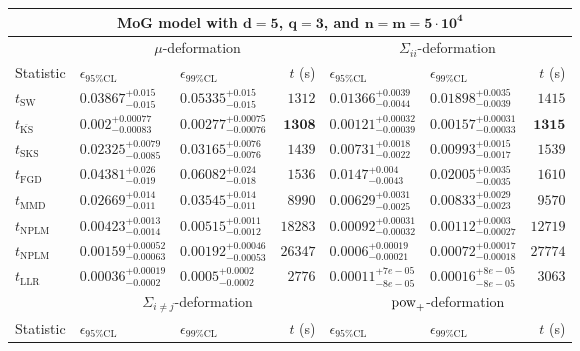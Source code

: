 \begin{tabular}{l|llr|llr}
	\toprule
	\multicolumn{7}{c}{{\bf MoG model with $\mathbf{d=5}$, $\mathbf{q=3}$, and $\mathbf{n=m=5\cdot 10^{4}}$}} \\
	\toprule
	\multicolumn{1}{c}{} & \multicolumn{3}{c}{$\mu$-deformation} & \multicolumn{3}{c}{$\Sigma_{ii}$-deformation} \\
	Statistic & $\epsilon_{95\%\mathrm{CL}}$ & $\epsilon_{99\%\mathrm{CL}}$ & $t$ (s) & $\epsilon_{95\%\mathrm{CL}}$ & $\epsilon_{99\%\mathrm{CL}}$ & $t$ (s) \\
	\midrule
	$t_{\mathrm{SW}}$ & $0.03867_{-0.015}^{+0.015}$ & $0.05335_{-0.015}^{+0.015}$ & $1312$ & $0.01366_{-0.0044}^{+0.0039}$ & $0.01898_{-0.0039}^{+0.0035}$ & $1415$ \\
	$t_{\overline{\mathrm{KS}}}$ & ${\mathbf{0.002_{-0.00083}^{+0.00077}}}$ & ${\mathbf{0.00277_{-0.00076}^{+0.00075}}}$ & ${\mathbf{1308}}$ & ${\mathbf{0.00121_{-0.00039}^{+0.00032}}}$ & ${\mathbf{0.00157_{-0.00033}^{+0.00031}}}$ & ${\mathbf{1315}}$ \\
	$t_{\mathrm{SKS}}$ & $0.02325_{-0.0085}^{+0.0079}$ & $0.03165_{-0.0076}^{+0.0076}$ & $1439$ & $0.00731_{-0.0022}^{+0.0018}$ & $0.00993_{-0.0017}^{+0.0015}$ & $1539$ \\
	$t_{\mathrm{FGD}}$ & $0.04381_{-0.019}^{+0.026}$ & $0.06082_{-0.018}^{+0.024}$ & $1536$ & $0.0147_{-0.0043}^{+0.004}$ & $0.02005_{-0.0035}^{+0.0035}$ & $1610$ \\
	$t_{\mathrm{MMD}}$ & $0.02669_{-0.011}^{+0.014}$ & $0.03545_{-0.011}^{+0.014}$ & $8990$ & $0.00629_{-0.0025}^{+0.0031}$ & $0.00833_{-0.0023}^{+0.0029}$ & $9570$ \\
\rowcolor{red!35}	$t_{\mathrm{NPLM}}$ & $0.00423_{-0.0014}^{+0.0013}$ & $0.00515_{-0.0012}^{+0.0011}$ & $18283$ & $0.00092_{-0.00032}^{+0.00031}$ & $0.00112_{-0.00027}^{+0.0003}$ & $12719$ \\
\rowcolor{blue!35}	$t_{\mathrm{NPLM}}$ & $0.00159_{-0.00063}^{+0.00052}$ & $0.00192_{-0.00053}^{+0.00046}$ & $26347$ & $0.0006_{-0.00021}^{+0.00019}$ & $0.00072_{-0.00018}^{+0.00017}$ & $27774$ \\
	$t_{\mathrm{LLR}}$ & $0.00036_{-0.0002}^{+0.00019}$ & $0.0005_{-0.0002}^{+0.0002}$ & $2776$ & $0.00011_{-8e-05}^{+7e-05}$ & $0.00016_{-8e-05}^{+8e-05}$ & $3063$ \\
	\toprule
	\multicolumn{1}{c}{} & \multicolumn{3}{c}{$\Sigma_{i\neq j}$-deformation} & \multicolumn{3}{c}{$\rm{pow}_{+}$-deformation} \\
	Statistic & $\epsilon_{95\%\mathrm{CL}}$ & $\epsilon_{99\%\mathrm{CL}}$ & $t$ (s) & $\epsilon_{95\%\mathrm{CL}}$ & $\epsilon_{99\%\mathrm{CL}}$ & $t$ (s) \\

\end{tabular}
